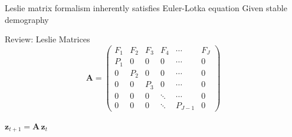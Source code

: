 \documentclass{beamer}
\begin{document}
{
  
}


\begin{frame}{Leslie matrix formalism inherently satisfies Euler-Lotka equation}
Given stable demography\\
\end{frame}

\begin{frame}{Review: Leslie Matrices}
\centering
\begin{equation*}
	\label{eq:A}
	\mathbf{A} = 
	\left( \begin{array}{cccccc}
		F_1 & F_2 & F_3 & F_4    & \cdots  & F_{J}   \\
		P_1 & 0   & 0   & 0      & \cdots  & 0       \\
		0   & P_2 & 0   & 0      & \cdots  & 0       \\
		0   & 0   & P_3 & 0      & \cdots  & 0       \\
		0   & 0   & 0   & \ddots & \cdots  & 0       \\
		0   & 0   & 0   & \ddots & P_{J-1} & 0
	\end{array} \right)
\end{equation*}
\\
\pause
\vspace{1.5cm}
$\mathbf{z}_{t+1} = \mathbf{A} \, \mathbf{z}_t$
\end{frame}
\end{document}
